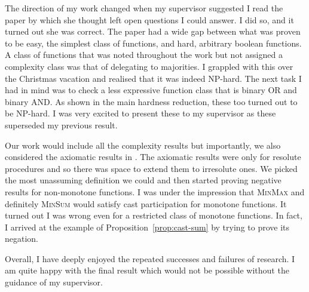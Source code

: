 \documentclass[11pt,a4paper, titlepage]{article}
\theoremstyle{definition}
\begin{document}
The direction of my work changed when my supervisor suggested I read the paper by \citet{grandi} which she thought left open questions I could answer.
I did so, and it turned out she was correct.
The paper had a wide gap between what was proven to be easy, the simplest class of functions, and hard, arbitrary boolean functions.
A class of functions that was noted throughout the work but not assigned a complexity class was that of delegating to majorities.
I grappled with this over the Christmas vacation and realised that it was indeed NP-hard.
The next task I had in mind was to check a less expressive function class that is binary OR and binary AND.
As shown in the main hardness reduction, these too turned out to be NP-hard.
I was very excited to present these to my supervisor as these superseded my previous result.

Our work would include all the complexity results but importantly, we also considered the axiomatic results in \citet{grandi}.
The axiomatic results were only for resolute procedures and so there was space to extend them to irresolute ones.
We picked the most unassuming definition we could and then started proving negative results for non-monotone functions.
I was under the impression that \textsc{MinMax} and definitely \textsc{MinSum} would satisfy cast participation for monotone functions.
It turned out I was wrong even for a restricted class of monotone functions. 
In fact, I arrived at the example of Proposition~\ref{prop:cast-sum} by trying to prove its negation.

Overall, I have deeply enjoyed the repeated successes and failures of research. 
I am quite happy with the final result which would not be possible without the guidance of my supervisor. 


\newpage


\end{document}
